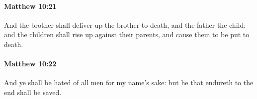 		\paragraph{Matthew 10:21} %
			\label{MATTHEW-10-21}

			And the brother shall deliver up the brother to death, and the father the child: and the children shall rise up against their parents, and cause them to be put to death.

			\begin{framed}
			\scriptsize
				\begin{compactdesc}
					\item[SBLG] 
				\end{compactdesc}
			\end{framed}

		\paragraph{Matthew 10:22} %
			\label{MATTHEW-10-22}

			And ye shall be hated of all men for my name's sake: but he that endureth to the end shall be saved.

